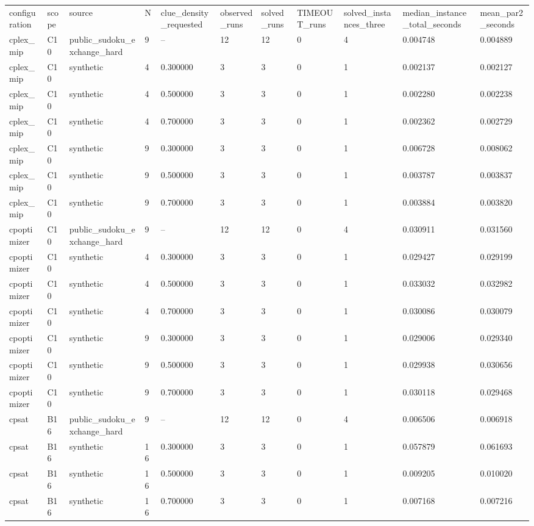 \begin{tabular}{lllllllllll}
\hline
configuration & scope & source & N & clue\_density\_requested & observed\_runs & solved\_runs & TIMEOUT\_runs & solved\_instances\_three & median\_instance\_total\_seconds & mean\_par2\_seconds \\
cplex\_mip & C10 & public\_sudoku\_exchange\_hard & 9 & -- & 12 & 12 & 0 & 4 & 0.004748 & 0.004889 \\
cplex\_mip & C10 & synthetic & 4 & 0.300000 & 3 & 3 & 0 & 1 & 0.002137 & 0.002127 \\
cplex\_mip & C10 & synthetic & 4 & 0.500000 & 3 & 3 & 0 & 1 & 0.002280 & 0.002238 \\
cplex\_mip & C10 & synthetic & 4 & 0.700000 & 3 & 3 & 0 & 1 & 0.002362 & 0.002729 \\
cplex\_mip & C10 & synthetic & 9 & 0.300000 & 3 & 3 & 0 & 1 & 0.006728 & 0.008062 \\
cplex\_mip & C10 & synthetic & 9 & 0.500000 & 3 & 3 & 0 & 1 & 0.003787 & 0.003837 \\
cplex\_mip & C10 & synthetic & 9 & 0.700000 & 3 & 3 & 0 & 1 & 0.003884 & 0.003820 \\
cpoptimizer & C10 & public\_sudoku\_exchange\_hard & 9 & -- & 12 & 12 & 0 & 4 & 0.030911 & 0.031560 \\
cpoptimizer & C10 & synthetic & 4 & 0.300000 & 3 & 3 & 0 & 1 & 0.029427 & 0.029199 \\
cpoptimizer & C10 & synthetic & 4 & 0.500000 & 3 & 3 & 0 & 1 & 0.033032 & 0.032982 \\
cpoptimizer & C10 & synthetic & 4 & 0.700000 & 3 & 3 & 0 & 1 & 0.030086 & 0.030079 \\
cpoptimizer & C10 & synthetic & 9 & 0.300000 & 3 & 3 & 0 & 1 & 0.029006 & 0.029340 \\
cpoptimizer & C10 & synthetic & 9 & 0.500000 & 3 & 3 & 0 & 1 & 0.029938 & 0.030656 \\
cpoptimizer & C10 & synthetic & 9 & 0.700000 & 3 & 3 & 0 & 1 & 0.030118 & 0.029468 \\
cpsat & B16 & public\_sudoku\_exchange\_hard & 9 & -- & 12 & 12 & 0 & 4 & 0.006506 & 0.006918 \\
cpsat & B16 & synthetic & 16 & 0.300000 & 3 & 3 & 0 & 1 & 0.057879 & 0.061693 \\
cpsat & B16 & synthetic & 16 & 0.500000 & 3 & 3 & 0 & 1 & 0.009205 & 0.010020 \\
cpsat & B16 & synthetic & 16 & 0.700000 & 3 & 3 & 0 & 1 & 0.007168 & 0.007216 \\

\end{tabular}
